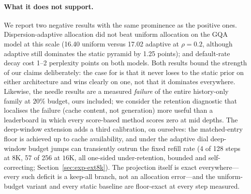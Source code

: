 \paragraph{What it does not support.}
We report two negative results with the same prominence as the positive
ones. Dispersion-adaptive allocation did not beat uniform allocation on
the GQA model at this scale (16.40 uniform versus 17.02 adaptive at
$\rho=0.2$, although adaptive still dominates the static pyramid by 1.25
points); and default-rate decay cost 1--2 perplexity points on both
models. Both results bound the strength of our claims deliberately: the
case for \laba{} is that it never loses to the static prior on either
architecture and wins clearly on one, not that it dominates everywhere.
Likewise, the needle results are a measured \emph{failure} of the entire
history-only family at $20\%$ budget, ours included; we consider the
retention diagnostic that localises the failure (cache content, not
generation) more useful than a leaderboard in which every score-based
method scores zero at mid depths. The deep-window extension adds a third
calibration, on ourselves: the matched-entry floor is achieved up to
cache availability, and under the adaptive dial deep-window budget jumps
can transiently outrun the fixed refill rate (4 of 128 steps at $8$K,
57 of 256 at $16$K, all one-sided under-retention, bounded and
self-correcting; Section~\ref{sec:exp-ext8k}). The projection itself is
exact everywhere---every such deficit is a keep-all branch, not an
allocation error---and the uniform-budget variant and every static
baseline are floor-exact at every step measured.

